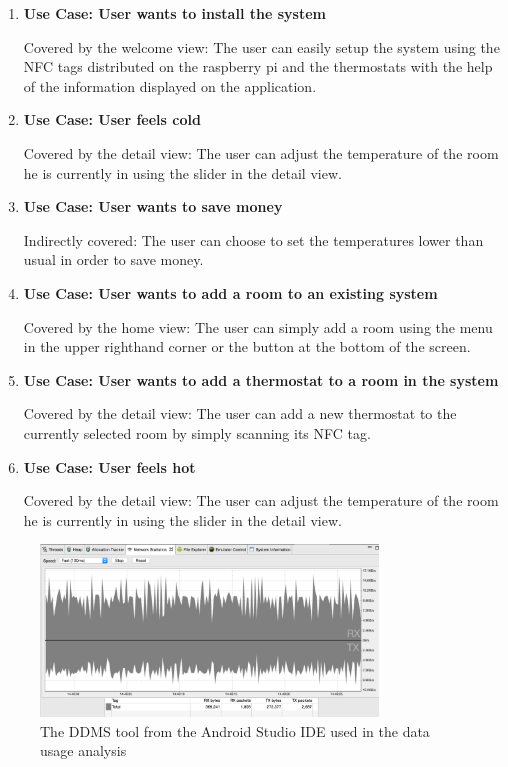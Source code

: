 \begin{enumerate}
\item \textbf{Use Case: User wants to install the system}

Covered by the welcome view: The user can easily setup the system using the NFC tags distributed on the raspberry pi and the thermostats with the help of the information displayed on the application.
\item \textbf{Use Case: User feels cold}

Covered by the detail view: The user can adjust the temperature of the room he is currently in using the slider in the detail view.
\item \textbf{Use Case: User wants to save money}

Indirectly covered: The user can choose to set the temperatures lower than usual in order to save money.
\item \textbf{Use Case: User wants to add a room to an existing system}

Covered by the home view: The user can simply add a room using the menu in the upper righthand corner or the button at the bottom of the screen.
\item \textbf{Use Case: User wants to add a thermostat to a room in the system}

Covered by the detail view: The user can add a new thermostat to the currently selected room by simply scanning its NFC tag.
\item \textbf{Use Case: User feels hot}

Covered by the detail view: The user can adjust the temperature of the room he is currently in using the slider in the detail view.
\end{enumerate}

\begin{figure} [h]
	\begin{center}
		\includegraphics[width=0.8\textwidth]{images/ddms.png}
	\end{center}
	\caption{The DDMS tool from the Android Studio IDE used in the data usage analysis}
	\label{fig:ddms}
\end{figure} 

